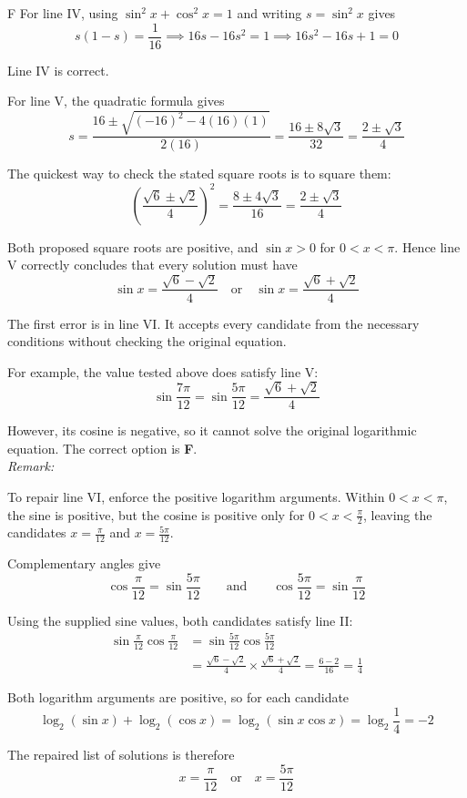 \documentclass[11pt,a4paper]{article}
\begin{document}
\begin{enumerate}[label=\textbf{\arabic*.},leftmargin=*,itemsep=0pt,start=12]
\begin{djsSolution}{F}
For line IV, using $\sin^2x+\cos^2x=1$ and writing $s=\sin^2x$ gives
\[
s(1-s)=\frac1{16}
\implies 16s-16s^2=1
\implies 16s^2-16s+1=0
\]

Line IV is correct.

For line V, the quadratic formula gives
\[
s=\frac{16\pm\sqrt{(-16)^2-4(16)(1)}}{2(16)}
=\frac{16\pm8\sqrt3}{32}
=\frac{2\pm\sqrt3}{4}
\]

The quickest way to check the stated square roots is to square them:
\[
\left(\frac{\sqrt6\pm\sqrt2}{4}\right)^2
=\frac{8\pm4\sqrt3}{16}
=\frac{2\pm\sqrt3}{4}
\]

Both proposed square roots are positive, and $\sin x>0$ for $0<x<\pi$. Hence line V correctly concludes that every solution must have
\[
\sin x=\frac{\sqrt6-\sqrt2}{4}
\quad\text{or}\quad
\sin x=\frac{\sqrt6+\sqrt2}{4}
\]

The first error is in line VI. It accepts every candidate from the necessary conditions without checking the original equation.

For example, the value tested above does satisfy line V:
\[
\sin\frac{7\pi}{12}
=\sin\frac{5\pi}{12}
=\frac{\sqrt6+\sqrt2}{4}
\]

However, its cosine is negative, so it cannot solve the original logarithmic equation. The correct option is \textbf{F}.\\[5pt]

\textit{Remark:}

To repair line VI, enforce the positive logarithm arguments. Within $0<x<\pi$, the sine is positive, but the cosine is positive only for $0<x<\frac\pi2$, leaving the candidates $x=\frac\pi{12}$ and $x=\frac{5\pi}{12}$.

Complementary angles give
\[
\cos\frac\pi{12}=\sin\frac{5\pi}{12}
\qquad\text{and}\qquad
\cos\frac{5\pi}{12}=\sin\frac\pi{12}
\]

Using the supplied sine values, both candidates satisfy line II:
\[
\begin{aligned}
\sin\frac\pi{12}\cos\frac\pi{12}
&=\sin\frac{5\pi}{12}\cos\frac{5\pi}{12}\\[8pt]
&=\frac{\sqrt6-\sqrt2}{4}\times\frac{\sqrt6+\sqrt2}{4}
=\frac{6-2}{16}=\frac14
\end{aligned}
\]

Both logarithm arguments are positive, so for each candidate
\[
\log_2(\sin x)+\log_2(\cos x)
=\log_2(\sin x\cos x)
=\log_2\frac14=-2
\]

The repaired list of solutions is therefore
\[
x=\frac\pi{12}\quad\text{or}\quad x=\frac{5\pi}{12}
\]
\end{djsSolution}
\end{enumerate}
\end{document}
